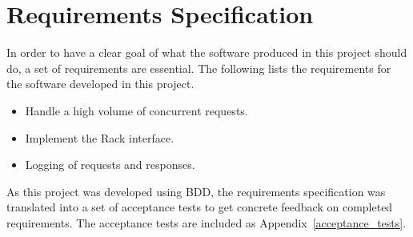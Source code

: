 \section{Requirements Specification}
In order to have a clear goal of what the software produced in this project
should do, a set of requirements are essential. The following lists the
requirements for the software developed in this project.

\begin{itemize}
  \item Handle a high volume of concurrent requests.
  \item Implement the Rack interface.
  \item Logging of requests and responses.
\end{itemize}

As this project was developed using BDD, the requirements specification was
translated into a set of acceptance tests to get concrete feedback on
completed requirements. The acceptance tests are included as
Appendix~\ref{acceptance_tests}.
